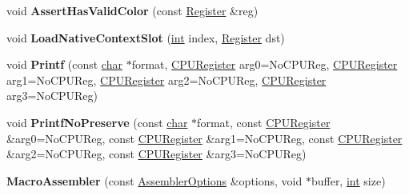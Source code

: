 \begin{DoxyCompactItemize}
\item 
\mbox{\label{classv8_1_1internal_1_1MacroAssembler_aa3870fe6f7683c2a79bec8f36e5810a0}} 
void {\bfseries Assert\+Has\+Valid\+Color} (const \mbox{\hyperlink{classv8_1_1internal_1_1Register}{Register}} \&reg)
\item 
\mbox{\label{classv8_1_1internal_1_1MacroAssembler_abb9c73f938328171318c7cc010a7b53c}} 
void {\bfseries Load\+Native\+Context\+Slot} (\mbox{\hyperlink{classint}{int}} index, \mbox{\hyperlink{classv8_1_1internal_1_1Register}{Register}} dst)
\item 
\mbox{\label{classv8_1_1internal_1_1MacroAssembler_aa7813997bfe749e0e8e0e3656af40214}} 
void {\bfseries Printf} (const \mbox{\hyperlink{classchar}{char}} $\ast$format, \mbox{\hyperlink{classv8_1_1internal_1_1CPURegister}{C\+P\+U\+Register}} arg0=No\+C\+P\+U\+Reg, \mbox{\hyperlink{classv8_1_1internal_1_1CPURegister}{C\+P\+U\+Register}} arg1=No\+C\+P\+U\+Reg, \mbox{\hyperlink{classv8_1_1internal_1_1CPURegister}{C\+P\+U\+Register}} arg2=No\+C\+P\+U\+Reg, \mbox{\hyperlink{classv8_1_1internal_1_1CPURegister}{C\+P\+U\+Register}} arg3=No\+C\+P\+U\+Reg)
\item 
\mbox{\label{classv8_1_1internal_1_1MacroAssembler_aaa574006b6ea4cbbb867fb35ed052b29}} 
void {\bfseries Printf\+No\+Preserve} (const \mbox{\hyperlink{classchar}{char}} $\ast$format, const \mbox{\hyperlink{classv8_1_1internal_1_1CPURegister}{C\+P\+U\+Register}} \&arg0=No\+C\+P\+U\+Reg, const \mbox{\hyperlink{classv8_1_1internal_1_1CPURegister}{C\+P\+U\+Register}} \&arg1=No\+C\+P\+U\+Reg, const \mbox{\hyperlink{classv8_1_1internal_1_1CPURegister}{C\+P\+U\+Register}} \&arg2=No\+C\+P\+U\+Reg, const \mbox{\hyperlink{classv8_1_1internal_1_1CPURegister}{C\+P\+U\+Register}} \&arg3=No\+C\+P\+U\+Reg)
\item 
\mbox{\label{classv8_1_1internal_1_1MacroAssembler_ab454c229ecab5061af905b7d5959c919}} 
{\bfseries Macro\+Assembler} (const \mbox{\hyperlink{structv8_1_1internal_1_1AssemblerOptions}{Assembler\+Options}} \&options, void $\ast$buffer, \mbox{\hyperlink{classint}{int}} size)
\item 
\mbox{\label{classv8_1_1internal_1_1MacroAssembler_ace8e2b09ca4bac1b40d12d84416284f9}} 

\end{DoxyCompactItemize}
